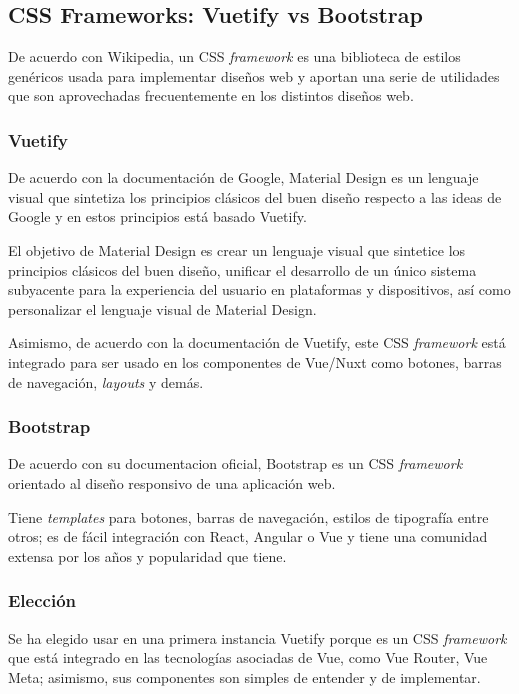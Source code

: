 \subsection{CSS Frameworks: Vuetify vs Bootstrap}
De acuerdo con Wikipedia\cite{wikipedia_contributors_css_2020}, un CSS \textit{framework} es una biblioteca de estilos genéricos usada para implementar diseños web y aportan una serie de utilidades que son aprovechadas frecuentemente en los distintos diseños web.

\subsubsection*{Vuetify}
De acuerdo con la documentación de Google\cite{noauthor_introduction_nodate}, Material Design es un lenguaje visual que sintetiza los principios clásicos del buen diseño respecto a las ideas de Google y en estos principios está basado Vuetify.


El objetivo de Material Design es crear un lenguaje visual que sintetice los principios clásicos del buen diseño, unificar el desarrollo de un único sistema subyacente para la experiencia del usuario en plataformas y dispositivos, así como personalizar el lenguaje visual de Material Design.


Asimismo, de acuerdo con la documentación de Vuetify\cite{noauthor_vuetify_nodate}, este CSS \textit{framework} está integrado para ser usado en los componentes de Vue/Nuxt como botones, barras de navegación, \textit{layouts} y demás.

\subsubsection*{Bootstrap}
De acuerdo con su documentacion oficial\cite{noauthor_documentation_nodate-1}, Bootstrap es un CSS \textit{framework} orientado al diseño responsivo de una aplicación web. 


Tiene \textit{templates} para botones, barras de navegación, estilos de tipografía entre otros; es de fácil integración con React, Angular o Vue y tiene una comunidad extensa por los años y popularidad que tiene.

\subsubsection*{Elección}

Se ha elegido usar en una primera instancia Vuetify porque es un CSS \textit{framework} que está integrado en las tecnologías asociadas de Vue, como Vue Router, Vue Meta; asimismo, sus componentes son simples de entender y de implementar.
